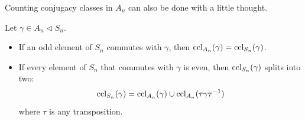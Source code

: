 \documentclass{../template/note}
\begin{document}
    Counting conjugacy classes in \(A_n\) can also be done with a little thought.

    \begin{lemma}
        Let \(\gamma \in A_n \triangleleft S_n\).
        \begin{itemize}
            \item If an odd element of \(S_n\) commutes with \(\gamma\), then \(\operatorname{ccl}_{A_n}(\gamma) = \operatorname{ccl}_{S_n}(\gamma)\).
            \item If every element of \(S_n\) that commutes with \(\gamma\) is even, then \(\operatorname{ccl}_{S_n}(\gamma)\) splits into two:
            \[
                \operatorname{ccl}_{S_n}(\gamma) = \operatorname{ccl}_{A_n}(\gamma) \cup \operatorname{ccl}_{A_n}(\tau \gamma \tau^{-1})
            \]
            where \(\tau\) is any transposition.
        \end{itemize}        
    \end{lemma}
    
\end{document}
